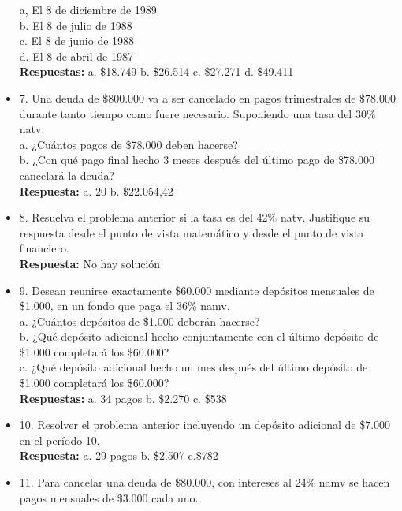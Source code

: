 \begin{itemize}
	a, El 8 de diciembre de 1989\\
	b. El 8 de julio de 1988\\
	c. El 8 de junio de 1988\\
	d. El 8 de abril de 1987\\
	\textbf{Respuestas:} a. \$18.749\hspace{1,5cm} b. \$26.514\hspace{1,5cm} c. \$27.271\hspace{1,5cm} d. \$49.411\\
	\medskip
	\item 7. Una deuda de \$800.000 va a ser cancelado en pagos trimestrales de \$78.000 durante tanto tiempo como fuere necesario. Suponiendo una tasa del 30\% natv.\\
	
	a. ¿Cuántos pagos de \$78.000 deben hacerse?\\
	b. ¿Con qué pago final hecho 3 meses después del último pago de \$78.000 cancelará la deuda?\\
	\textbf{Respuesta:} a. 20\hspace{1,5cm} b. \$22.054,42\\
	\medskip
	\item 8. Resuelva el problema anterior si la tasa es del 42\% natv. Justifique su respuesta desde el punto de vista matemático y desde el punto de vista financiero.\\
	\textbf{Respuesta:} No hay solución\\
	\medskip
	\item 9. Desean reunirse exactamente \$60.000 mediante depósitos mensuales de \$1.000, en un fondo que paga el 36\% namv.\\
	
	a. ¿Cuántos depósitos de \$1.000 deberán hacerse?\\
	b. ¿Qué depósito adicional hecho conjuntamente con el último depósito de \$1.000 completará los \$60.000?\\
	c. ¿Qué depósito adicional hecho un mes después del último depósito de \$1.000 completará los \$60.000?\\
	\textbf{Respuestas:} a. 34 pagos  \hspace{1,5cm} b. \$2.270\hspace{1,5cm}  c. \$538\\
	\medskip
	\item 10. Resolver el problema anterior incluyendo un depósito adicional de \$7.000 en el período 10.\\
	\textbf{Respuesta:} a. 29 pagos\hspace{1,5cm} b. \$2.507\hspace{1,5cm} c.\$782\\
	\medskip
	\item 11. Para cancelar una deuda de \$80.000, con intereses al 24\% namv se hacen pagos mensuales de \$3.000 cada uno.\\
	

\end{itemize}
